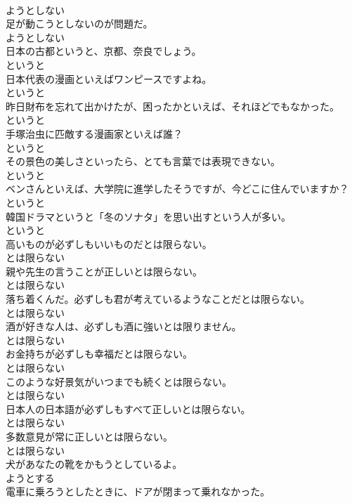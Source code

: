 \documentclass[8pt]{extreport}
\begin{document}
\begin{CJK}{UTF8}{min}
\\	ようとしない
\\	足が動こうとしないのが問題だ。	
\\	ようとしない
\\	日本の古都というと、京都、奈良でしょう。	
\\	というと
\\	日本代表の漫画といえばワンピースですよね。	
\\	というと
\\	昨日財布を忘れて出かけたが、困ったかといえば、それほどでもなかった。	
\\	というと
\\	手塚治虫に匹敵する漫画家といえば誰？	
\\	というと
\\	その景色の美しさといったら、とても言葉では表現できない。	
\\	というと
\\	ベンさんといえば、大学院に進学したそうですが、今どこに住んでいますか？	
\\	というと
\\	韓国ドラマというと「冬のソナタ」を思い出すという人が多い。	
\\	というと
\\	高いものが必ずしもいいものだとは限らない。	
\\	とは限らない
\\	親や先生の言うことが正しいとは限らない。	
\\	とは限らない
\\	落ち着くんだ。必ずしも君が考えているようなことだとは限らない。	
\\	とは限らない
\\	酒が好きな人は、必ずしも酒に強いとは限りません。	
\\	とは限らない
\\	お金持ちが必ずしも幸福だとは限らない。	
\\	とは限らない
\\	このような好景気がいつまでも続くとは限らない。	
\\	とは限らない
\\	日本人の日本語が必ずしもすべて正しいとは限らない。	
\\	とは限らない
\\	多数意見が常に正しいとは限らない。	
\\	とは限らない
\\	犬があなたの靴をかもうとしているよ。	
\\	ようとする
\\	電車に乗ろうとしたときに、ドアが閉まって乗れなかった。	

\end{CJK}
\end{document}
